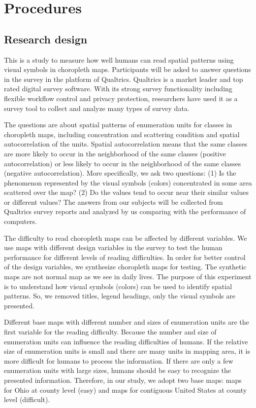 \section{Procedures}

\subsection{Research design}

This is a study to measure how well humans can read spatial patterns using visual symbols in choropleth maps. Participants will be asked to answer questions in the survey in the platform of Qualtrics. Qualtrics is a market leader and top rated digital survey software. With its strong survey functionality including flexible workflow control and privacy protection, researchers have used it as a survey tool to collect and analyze many types of survey data. 

The questions are about spatial patterns of enumeration units for classes in choropleth maps, including concentration and scattering condition and spatial autocorrelation of the units. Spatial autocorrelation means that the same classes are more likely to occur in the neighborhood of the same classes (positive autocorrelation) or less likely to occur in the neighborhood of the same classes (negative autocorrelation). More specifically, we ask two questions: (1) Is the phenomenon represented by the visual symbols (colors) concentrated in some area scattered over the map? (2) Do the values tend to occur near their similar values or different values? The answers from our subjects will be collected from Qualtrics survey reports and analyzed by us comparing with the performance of computers.

The difficulty to read choropleth maps can be affected by different variables. We use maps with different design variables in the survey to test the human performance for different levels of reading difficulties. In order for better control of the design variables, we synthesize choropleth maps for testing.
The synthetic maps are not normal map as we see in daily lives. The purpose of this experiment is to understand how visual symbols (colors) can be used to identify spatial patterns. So, we removed titles, legend headings, only the visual symbols are presented.

Different base maps with different number and sizes of enumeration units are the first variable for the reading difficulty. Because the number and size of enumeration units can influence the reading difficulties of humans. If the relative size of enumeration units is small and there are many units in mapping area, it is more difficult for humans to process the information. If there are only a few enumeration units with large sizes, humans should be easy to recognize the presented information. Therefore, in our study, we adopt two base maps: maps for Ohio at county level (easy) and maps for contiguous United States at county level (difficult). 

